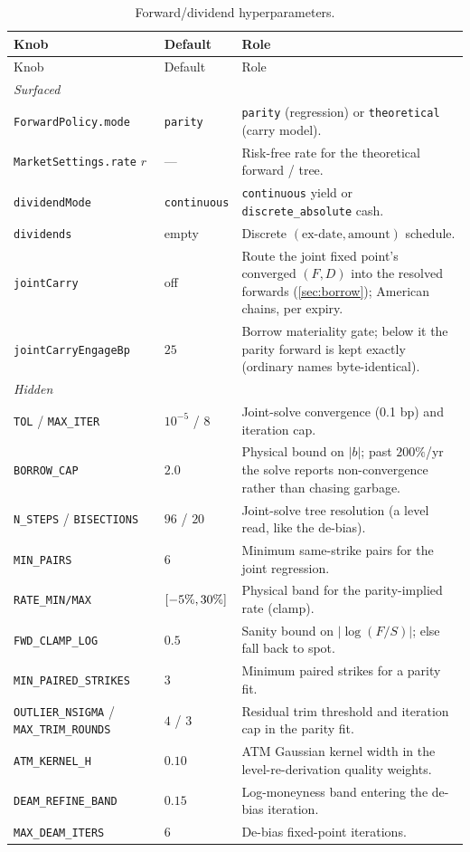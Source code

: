 \documentclass[11pt]{article}
\begin{document}
\begin{longtable}{p{}p{}p{}}
\caption{Forward/dividend hyperparameters.}\label{tab:atlas}\\
\toprule Knob & Default & Role\\ \midrule
\endfirsthead \toprule Knob & Default & Role\\ \midrule \endhead
\multicolumn{3}{l}{\emph{Surfaced}}\\ \midrule
\texttt{ForwardPolicy.mode} & \texttt{parity} & \texttt{parity} (regression) or \texttt{theoretical} (carry model).\\
\texttt{MarketSettings.rate} $r$ & --- & Risk-free rate for the theoretical forward / tree.\\
\texttt{dividendMode} & \texttt{continuous} & \texttt{continuous} yield or \texttt{discrete\_absolute} cash.\\
\texttt{dividends} & empty & Discrete $(\text{ex-date},\text{amount})$ schedule.\\
\texttt{jointCarry} & off & Route the joint fixed point's converged $(F,D)$
into the resolved forwards (\cref{sec:borrow}); American chains, per expiry.\\
\texttt{jointCarryEngageBp} & $25$ & Borrow materiality gate; below it the
parity forward is kept exactly (ordinary names byte-identical).\\
\midrule
\multicolumn{3}{l}{\emph{Hidden}}\\ \midrule
\texttt{TOL} / \texttt{MAX\_ITER} & $10^{-5}$ / $8$ & Joint-solve convergence
(0.1 bp) and iteration cap.\\
\texttt{BORROW\_CAP} & $2.0$ & Physical bound on $|b|$; past $200\%$/yr the
solve reports non-convergence rather than chasing garbage.\\
\texttt{N\_STEPS} / \texttt{BISECTIONS} & $96$ / $20$ & Joint-solve tree
resolution (a level read, like the de-bias).\\
\texttt{MIN\_PAIRS} & $6$ & Minimum same-strike pairs for the joint
regression.\\
\texttt{RATE\_MIN/MAX} & $[-5\%,30\%]$ & Physical band for the parity-implied rate (clamp).\\
\texttt{FWD\_CLAMP\_LOG} & $0.5$ & Sanity bound on $|\log(F/S)|$; else fall back to spot.\\
\texttt{MIN\_PAIRED\_STRIKES} & $3$ & Minimum paired strikes for a parity fit.\\
\texttt{OUTLIER\_NSIGMA} / \texttt{MAX\_TRIM\_ROUNDS} & $4$ / $3$ & Residual
trim threshold and iteration cap in the parity fit.\\
\texttt{ATM\_KERNEL\_H} & $0.10$ & ATM Gaussian kernel width in the
level-re-derivation quality weights.\\
\texttt{DEAM\_REFINE\_BAND} & $0.15$ & Log-moneyness band entering the de-bias
iteration.\\
\texttt{MAX\_DEAM\_ITERS} & $6$ & De-bias fixed-point iterations.\\
\bottomrule
\end{longtable}
\end{document}
